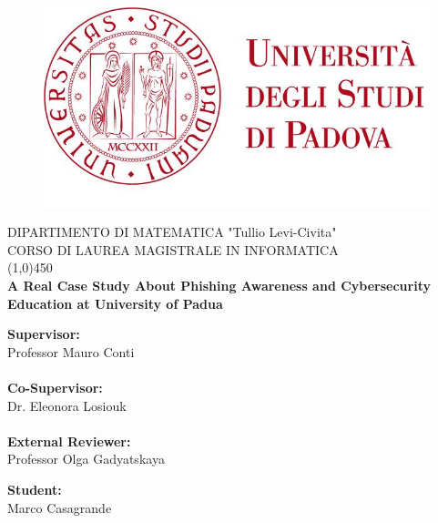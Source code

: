 \documentclass[a4paper]{article}
\begin{document}
\begin{titlepage}

\begin{figure}[H]
	\centering
	\includegraphics[scale=0.4]{images/logounipd.jpg}
\end{figure}

\begin{center}
	\LARGE DIPARTIMENTO DI MATEMATICA "Tullio Levi-Civita" \\
    \vspace{5mm}
    \LARGE CORSO DI LAUREA MAGISTRALE IN INFORMATICA \\
	\vspace{8mm}
    \line(1,0){450} \\
    \vspace{10mm}
    \huge \textbf{A Real Case Study About Phishing Awareness and Cybersecurity Education at University of Padua} \\
\end{center}

\vspace{36mm}

\begin{minipage}[t]{0.50\textwidth}
	{\large{\bf Supervisor:}\vspace{1mm} \\ Professor Mauro Conti}
	\\ \\
	{\large{\bf Co-Supervisor:}\vspace{1mm} \\ Dr. Eleonora Losiouk}
	\\ \\
	{\large{\bf External Reviewer:}\vspace{1mm} \\ Professor Olga Gadyatskaya}
\end{minipage}
\hfill
\begin{minipage}[t]{0.50\textwidth}
	\raggedleft
	{\large{\bf Student:} \\ Marco Casagrande\\ }
\end{minipage}

\vspace*{\fill}


\end{titlepage}
\end{document}
